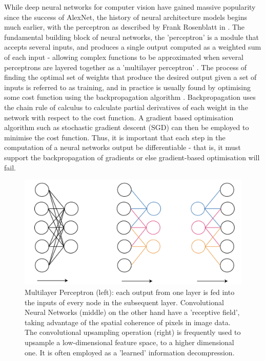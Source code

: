\documentclass[openany]{book}
\begin{document}
While deep neural networks for computer vision have gained massive popularity since the success of AlexNet, the history of neural architecture models begins much earlier, with the perceptron as described by Frank Rosenblatt in \cite{rosenblatt1959neurodynamics}. The fundamental building block of neural networks, the 'perceptron' is a module that accepts several inputs, and produces a single output computed as a weighted sum of each input - allowing complex functions to be approximated when several perceptrons are layered together as a 'multilayer perceptron' \cite{minsky1969perceptrons}. The process of finding the optimal set of weights that produce the desired output given a set of inputs is referred to as training, and in practice is usually found by optimising some cost function using the backpropagation algorithm \cite{rumelhart1986backprop}. Backpropagation uses the chain rule of calculus to calculate partial derivatives of each weight in the network with respect to the cost function. A gradient based optimisation algorithm such as stochastic gradient descent (SGD) can then be employed to minimise the cost function. Thus, it is important that each step in the computation of a neural networks output be differentiable - that is, it must support the backpropagation of gradients or else gradient-based optimisation will fail.

\begin{figure}[tbp]
    \centering
    \includegraphics[width=5in]{images/cnnvsmlp.png}
    
    \caption{Multilayer Perceptron (left): each output from one layer is fed into the inputs of every node in the subsequent layer. Convolutional Neural Networks (middle) on the other hand have a 'receptive field', taking advantage of the spatial coherence of pixels in image data. The convolutional upsampling operation (right) is frequently used to upsample a low-dimensional feature space, to a higher dimensional one. It is often employed as a 'learned' information decompression.}
    
    \label{convexhull}
\end{figure}
\end{document}
